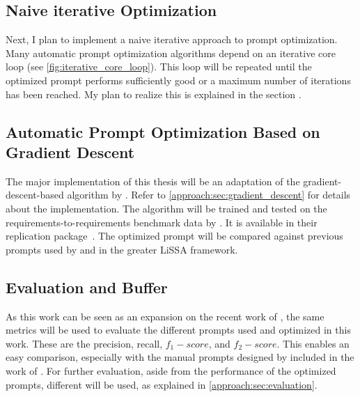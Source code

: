 \subsection{Naive iterative Optimization}
\label{phase_naive_iterative}

Next, I plan to implement a naive iterative approach to prompt optimization.
Many automatic prompt optimization algorithms \citeiterative depend on an iterative core loop (see \autoref{fig:iterative_core_loop}). This loop will be repeated until the optimized prompt performs sufficiently good or a maximum number of iterations has been reached.
My plan to realize this is explained in the section .


\subsection{Automatic Prompt Optimization Based on Gradient Descent}
\label{phase_gradient_descent}

The major implementation of this thesis will be an adaptation of the gradient-descent-based \APO algorithm by .
Refer to \autoref{approach:sec:gradient_descent} for details about the implementation.
The \APO algorithm will be trained and tested on the requirements-to-requirements benchmark data by \citeauthor{hey2025RequirementsTraceability}.
It is available in their replication package~\cite{hey2025ReplicationPackage}.
The optimized prompt will be compared against previous prompts used by \citeauthor{fuchss2025LiSSAGeneric} and \citeauthor{hey2025RequirementsTraceability} in the greater LiSSA framework.


\subsection{Evaluation and Buffer}
\label{phase_evaluation}
As this work can be seen as an expansion on the recent work of , the same metrics will be used to evaluate the different prompts used and optimized in this work.
These are the precision, recall, $f_1-score$, and $f_2-score$.
This enables an easy comparison, especially with the manual prompts designed by  included in the work of \citeauthor{hey2025RequirementsTraceability}.
For further evaluation, aside from the performance of the optimized prompts, different \LLMs will be used, as explained in \autoref{approach:sec:evaluation}.




